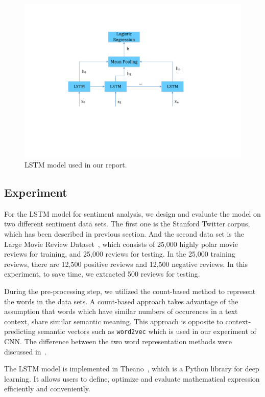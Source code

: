 \begin{figure}
\centering
\includegraphics[scale=0.5]{figure/lstm_model.pdf}
\caption{LSTM model used in our report.}
\label{fig:lstm_model}
\end{figure}

\subsection{Experiment}

For the LSTM model for sentiment analysis, we design and evaluate the model on two different sentiment data sets. The first one is the Stanford Twitter corpus, which has been described in previous section. And the second data set is the Large Movie Review Dataset~\cite{maas2011}, which consists of 25,000 highly polar movie reviews for training, and 25,000 reviews for testing. In the 25,000 training reviews, there are 12,500 positive reviews and 12,500 negative reviews. In this experiment, to save time, we extracted 500 reviews for testing.

During the pre-processing step, we utilized the count-based method to represent the words in the data sets. A count-based approach takes advantage of the assumption that words which have similar numbers of occurences in a text context, share similar semantic meaning. This approach is opposite to context-predicting semantic vectors such as {\tt word2vec} which is used in our experiment of CNN. The difference between the two word representation methods were discussed in~\cite{baroni2014}. 

The LSTM model is implemented in Theano~\cite{bastien2012, bergstra2010}, which is a Python library for deep learning. It allows users to define, optimize and evaluate mathematical expression efficiently and conveniently. 

